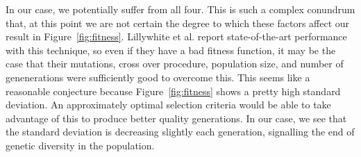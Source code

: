 \documentclass[conference]{IEEEtran}
\begin{document}
In our case, we potentially suffer from all four. This is such a complex conundrum that, at this point we are not certain the degree to which these factors affect our result in Figure~\ref{fig:fitness}. Lillywhite et al. report state-of-the-art performance with this technique, so even if they have a bad fitness function, it may be the case that their mutations, cross over procedure, population size, and number of genenerations were sufficiently good to overcome this. This seems like a reasonable conjecture because Figure~\ref{fig:fitness} shows a pretty high standard deviation. An approximately optimal selection criteria would be able to take advantage of this to produce better quality generations. In our case, we see that the standard deviation is decreasing slightly each generation, signalling the end of genetic diversity in the population.
\end{document}
